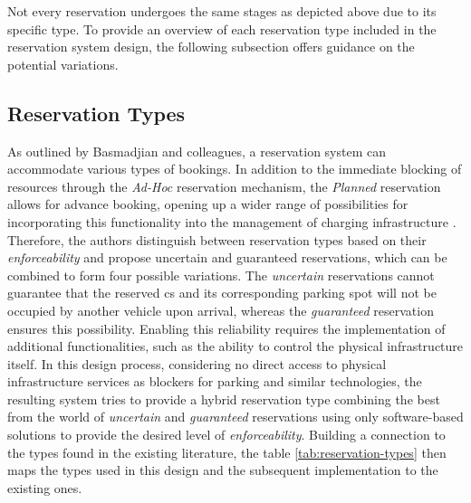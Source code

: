 \noindent Not every reservation undergoes the same stages as depicted above due to its specific type. To provide an overview of each reservation type included in the reservation system design, the following subsection offers guidance on the potential variations.

\newpage

\subsection{Reservation Types}
\label{ch:Design:sec:Reservation:ssec:Reservation Types}

As outlined by Basmadjian and colleagues, a reservation system can accommodate various types of bookings. In addition to the immediate blocking of resources through the \textit{Ad-Hoc} reservation mechanism, the \textit{Planned} reservation allows for advance booking, opening up a wider range of possibilities for incorporating this functionality into the management of charging infrastructure \cite{basmadjian_interoperable_2019,basmadjian_reference_2020}.
Therefore, the authors distinguish between reservation types based on their \textit{enforceability} and propose uncertain and guaranteed reservations, which can be combined to form four possible variations.
The \textit{uncertain} reservations cannot guarantee that the reserved \acrshort{cs} and its corresponding parking spot will not be occupied by another vehicle upon arrival, whereas the \textit{guaranteed} reservation ensures this possibility.
Enabling this reliability requires the implementation of additional functionalities, such as the ability to control the physical infrastructure itself.
In this design process, considering no direct access to physical infrastructure services as blockers for parking and similar technologies, the resulting system tries to provide a hybrid reservation type combining the best from the world of \textit{uncertain} and \textit{guaranteed} reservations using only software-based solutions to provide the desired level of \textit{enforceability}.
Building a connection to the types found in the existing literature, the table \ref{tab:reservation-types} then maps the types used in this design and the subsequent implementation to the existing ones.

